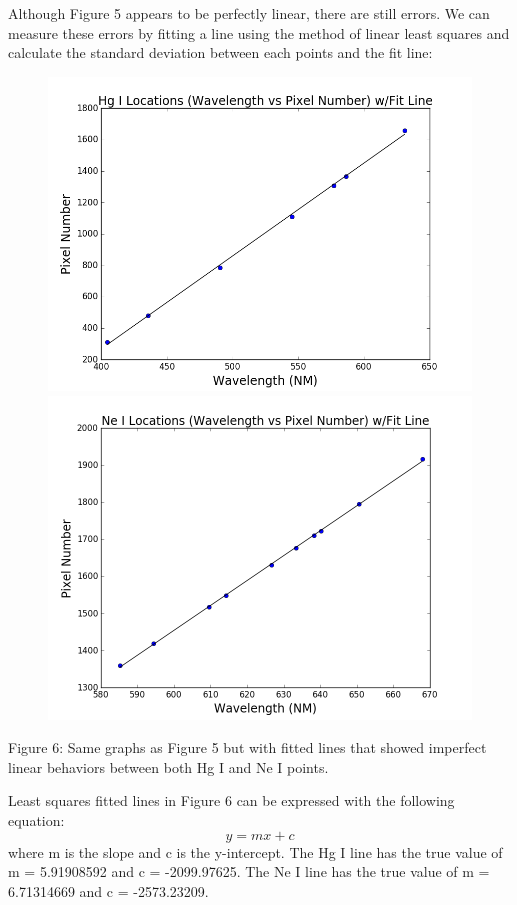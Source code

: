 \documentclass[onecolumn, 12pt, a4paper]{article}
\begin{document}
Although Figure 5 appears to be perfectly linear, there are still errors. We can measure these errors by fitting a line using the method of linear least squares and calculate the standard deviation between each points and the fit line:  

\begin{subfigure}{\linewidth}\hspace*{-1.3cm}
\includegraphics[width=.55\linewidth]{Hg1locline.png}
\includegraphics[width=.54\linewidth]{Ne1locline.png}
\end{subfigure}\par\medskip
\newline
\begin{flushleft}
Figure 6: Same graphs as Figure 5 but with fitted lines that showed imperfect linear behaviors between both Hg I and Ne I points. 
\end{flushleft}
Least squares fitted lines in Figure 6 can be expressed with the following equation: \[y = mx + c\] where m is the slope and c is the y-intercept. The Hg I line has the true value of m = 5.91908592 and c = -2099.97625. The Ne I line has the true value of m = 6.71314669 and c = -2573.23209. 
\end{document}
